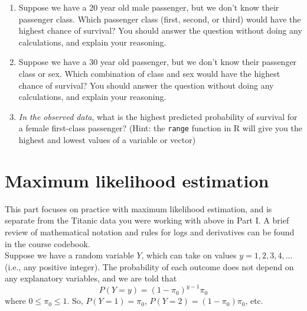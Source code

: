 \documentclass[11pt]{article}
\begin{document}
\begin{enumerate}
\begin{enumerate}
\item Suppose we have a 20 year old male passenger, but we don't know their passenger class. Which passenger class (first, second, or third) would have the highest chance of survival? You should answer the question without doing any calculations, and explain your reasoning.

\item Suppose we have a 30 year old passenger, but we don't know their passenger class or sex. Which combination of class and sex would have the highest chance of survival? You should answer the question without doing any calculations, and explain your reasoning.

\item \textit{In the observed data}, what is the highest predicted probability of survival for a female first-class passenger? (Hint: the \verb;range; function in R will give you the highest and lowest values of a variable or vector)

\end{enumerate}

\end{enumerate}

\newpage

\section{Maximum likelihood estimation}

This part focuses on practice with maximum likelihood estimation, and is separate from the Titanic data you were working with above in Part I. A brief review of mathematical notation and rules for logs and derivatives can be found in the course codebook.\\

\noindent Suppose we have a random variable $Y$, which can take on values $y = 1, 2, 3, 4,...$ (i.e., any positive integer). The probability of each outcome does not depend on any explanatory variables, and we are told that
$$P(Y = y) = (1 - \pi_0)^{y-1} \pi_0$$
where $0 \leq \pi_0 \leq 1$. So, $P(Y = 1) = \pi_0$, $P(Y = 2) = (1 - \pi_0)\pi_0$, etc.
\end{document}
